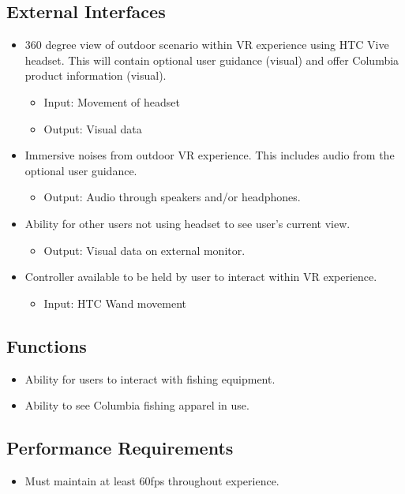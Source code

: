 \documentclass[10pt,journal,compsoc,onecolumn, draftclsnofoot]{IEEEtran}
\begin{document}
\subsection{External Interfaces}
\begin{itemize}
  \item 360 degree view of outdoor scenario within VR experience using HTC Vive
  headset. This will contain optional user guidance (visual) and offer Columbia
  product information (visual).
    \begin{itemize}
      \item Input: Movement of headset
      \item Output: Visual data
    \end{itemize}
  \item Immersive noises from outdoor VR experience. This includes audio from
  the optional user guidance.
    \begin{itemize}
      \item Output: Audio through speakers and/or headphones.
    \end{itemize}
  \item Ability for other users not using headset to see user's current view.
    \begin{itemize}
      \item Output: Visual data on external monitor.
    \end{itemize}
  \item Controller available to be held by user to interact within VR experience.
    \begin{itemize}
      \item Input: HTC Wand movement
    \end{itemize}
\end{itemize}

\subsection{Functions}
\begin{itemize}
  \item Ability for users to interact with fishing equipment.
  \item Ability to see Columbia fishing apparel in use.
\end{itemize}

\subsection{Performance Requirements}
\begin{itemize}
  \item Must maintain at least 60fps throughout experience.\cite{hall_2016}
\end{itemize}
\end{document}

